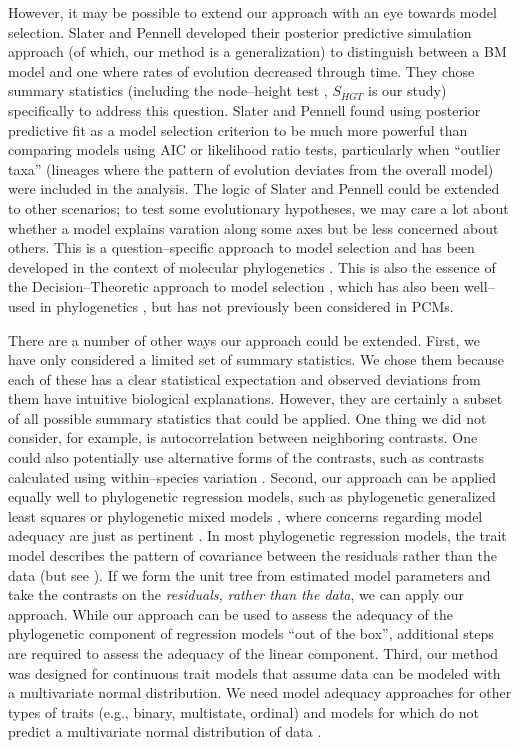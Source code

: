 \documentclass[a4paper,12pt]{article}
\begin{document}
However, it may be possible to extend our approach with an eye towards model selection. Slater and Pennell \citep{SlaterPennell} developed their posterior predictive simulation approach (of which, our method is a generalization) to distinguish between a BM model and one where rates of evolution decreased through time. They chose summary statistics (including the node--height test \citep{FreckletonHarvey2006}, $S_{HGT}$ is our study) specifically to address this question. Slater and Pennell found using posterior predictive fit as a model selection criterion to be much more powerful than comparing models using AIC or likelihood ratio tests, particularly when ``outlier taxa'' (lineages where the pattern of evolution deviates from the overall model) were included in the analysis. The logic of Slater and Pennell could be extended to other scenarios; to test some evolutionary hypotheses, we may care a lot about whether a model explains varation along some axes but be less concerned about others. This is a question--specific approach to model selection and has been developed in the context of molecular phylogenetics \citep{Bollback2002, Lewis2013}. This is also the essence of the Decision--Theoretic approach to model selection \citep{Robert2007}, which has also been well--used in phylogenetics \citep{Minin2003}, but has not previously been considered in PCMs.

There are a number of other ways our approach could be extended. First, we have only considered a limited set of summary statistics. We chose them because each of these has a clear statistical expectation and observed deviations from them have intuitive biological explanations. However, they are certainly a subset of all possible summary statistics that could be applied. One thing we did not consider, for example, is autocorrelation between neighboring contrasts. One could also potentially use alternative forms of the contrasts, such as contrasts calculated using within--species variation \citep{Felsenstein2008}. Second, our approach can be applied equally well to phylogenetic regression models, such as phylogenetic generalized least squares \citep{Grafen1989} or phylogenetic mixed models \citep{Lynch1991, Hadfield2010}, where concerns regarding model adequacy are just as pertinent \citep{Hansen2012}. In most phylogenetic regression models, the trait model describes the pattern of covariance between the residuals rather than the data \citep{Rohlf2001, Rohlf2006} (but see \citep{Hansen2008}). If we form the unit tree from estimated model parameters and take the contrasts on the \emph{residuals, rather than the data}, we can apply our approach. While our approach can be used to assess the adequacy of the phylogenetic component of regression models ``out of the box'', additional steps are required to assess the adequacy of the linear component. Third, our method was designed for continuous trait models that assume data can be modeled with a multivariate normal distribution. We need model adequacy approaches for other types of traits (e.g., binary, multistate, ordinal) and models for which do not predict a multivariate normal distribution of data \citep{Landis2012}.
\end{document}
